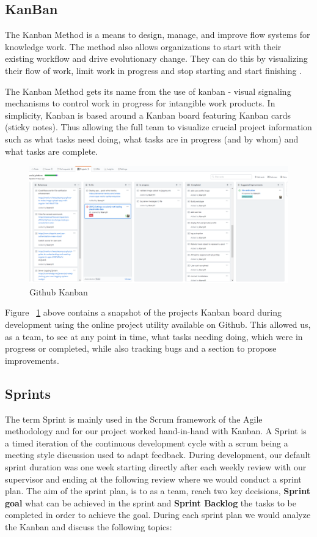 \subsection{KanBan} \label{KanbanSection}
The Kanban Method is a means to design, manage, and improve flow systems for knowledge work. The method also allows organizations to start with their existing workflow and drive evolutionary change. They can do this by visualizing their flow of work, limit work in progress and stop starting and start finishing \cite{kanban}.

The Kanban Method gets its name from the use of kanban - visual signaling mechanisms to control work in progress for intangible work products. In simplicity, Kanban is based around a Kanban board featuring Kanban cards (sticky notes). Thus allowing the full team to visualize crucial project information such as what tasks need doing, what tasks are in progress (and by whom) and what tasks are complete. 

\begin{figure}[H]
  \includegraphics[width=\linewidth]{img/kanban.PNG}
  \caption{Github Kanban}
  \label{fig:kanban}
\end{figure}

Figure  ~\ref{fig:kanban} above contains a snapshot of the projects Kanban board during development using the online project utility available on Github. This allowed us, as a team, to see at any point in time, what tasks needing doing, which were in progress or completed, while also tracking bugs and a section to propose improvements.

\subsection{Sprints}
The term Sprint is mainly used in the Scrum framework of the Agile methodology and for our project worked hand-in-hand with Kanban. A Sprint is a timed iteration of the continuous development cycle with a scrum being a meeting style discussion used to adapt feedback. During development, our default sprint duration was one week starting directly after each weekly review with our supervisor and ending at the following review where we would conduct a sprint plan. The aim of the sprint plan, is to as a team, reach two key decisions, \textbf{Sprint goal} what can be achieved in the sprint and \textbf{Sprint Backlog} the tasks to be completed in order to achieve the goal. During each sprint plan we would analyze the Kanban and discuss the following topics:

